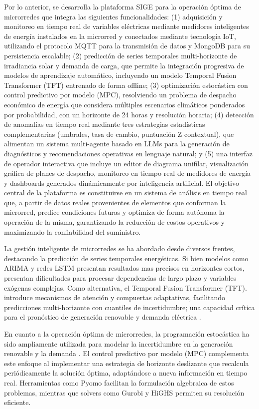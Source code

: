 \documentclass[journal,article,submit,pdftex,moreauthors]{Definitions/mdpi}
\begin{document}
Por lo anterior, se desarrolla la plataforma SIGE para la operación óptima de  microrredes que integra las siguientes funcionalidades: (1) adquisici\'on y monitoreo en tiempo real de variables el\'ectricas mediante medidores inteligentes de energía instalados en la microrred y conectados mediante tecnología IoT, utilizando el protocolo MQTT para la transmisi\'on de datos y MongoDB para su persistencia escalable; (2) predicci\'on de series temporales multi-horizonte de irradiancia solar y demanda de carga, que permite la integraci\'on progresiva de modelos de aprendizaje autom\'atico, incluyendo un modelo Temporal Fusion Transformer (TFT) entrenado de forma offline; (3) optimizaci\'on estoc\'astica con control predictivo por modelo (MPC), resolviendo un problema de despacho econ\'omico de energía que considera m\'ultiples escenarios clim\'aticos ponderados por probabilidad, con un horizonte de 24 horas y resoluci\'on horaria; (4) detecci\'on de anomal\'ias en tiempo real mediante tres estrategias estad\'isticas complementarias (umbrales, tasa de cambio, puntuaci\'on Z contextual), que alimentan un sistema multi-agente basado en LLMs para la generaci\'on de diagn\'osticos y recomendaciones operativas en lenguaje natural; y (5) una interfaz de operador interactiva que incluye un editor de diagrama unifilar, visualizaci\'on gr\'afica de planes de despacho, monitoreo en tiempo real de medidores de energía y dashboards generados din\'amicamente por inteligencia artificial. El objetivo central de la plataforma es constituirse en un sistema de an\'alisis en tiempo real que, a partir de datos reales provenientes de elementos que conforman la microrred, predice condiciones futuras y optimiza de forma aut\'onoma la operaci\'on de la misma, garantizando la reducci\'on de costos operativos y maximizando la confiabilidad del suministro.

La gestión inteligente de microrredes se ha abordado desde diversos frentes, destacando la predicción de series temporales energéticas. Si bien modelos como ARIMA y redes LSTM presentan resultados mas precisos en horizontes cortos, presentan dificultades para procesar dependencias de largo plazo y variables exógenas complejas. Como alternativa, el Temporal Fusion Transformer (TFT). \cite{ref-lim} introduce mecanismos de atención y compuertas adaptativas, facilitando predicciones multi-horizonte con cuantiles de incertidumbre; una capacidad crítica para el pronóstico de generación renovable y demanda eléctrica \cite{ref-rao,ref-tasmant}.

En cuanto a la operaci\'on \'optima de microrredes, la programaci\'on estoc\'astica ha sido ampliamente utilizada para modelar la incertidumbre en la generaci\'on renovable y la demanda \cite{ref-birge}. El control predictivo por modelo (MPC) \cite{ref-rawlings} complementa este enfoque al implementar una estrategia de horizonte deslizante que recalcula peri\'odicamente la soluci\'on \'optima, adapt\'andose a nueva informaci\'on en tiempo real. Herramientas como Pyomo \cite{ref-bynum} facilitan la formulaci\'on algebraica de estos problemas, mientras que solvers como Gurobi \cite{ref-gurobi} y HiGHS \cite{ref-huangfu} permiten su resoluci\'on eficiente.
\end{document}
